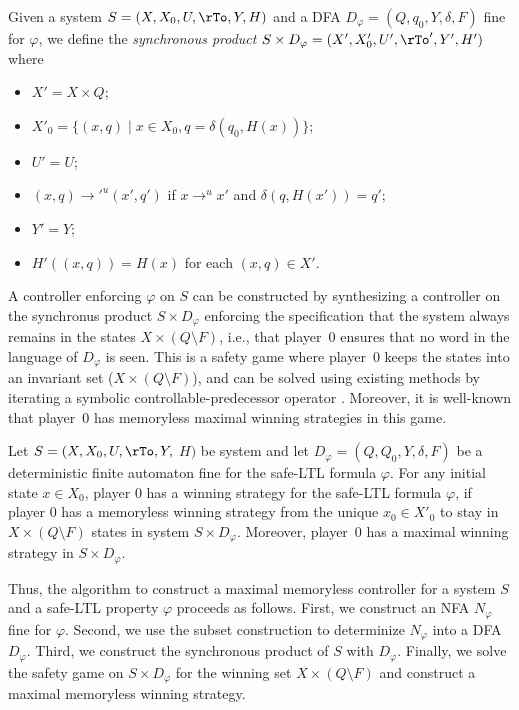 Given a system $S = (X, X_0, U, \rTo, Y, H)$ and a DFA $D_{\varphi} =
(Q, q_0, Y, \delta, F)$ fine for $\varphi$, we
define the \emph{synchronous product} $S\times D_{\varphi} =
(X',X'_0,U',\rTo', Y', H')$ where
\begin{itemize}
 \item $X' = X \times Q$;
 \item $X'_0 = \{(x,q) \mid x \in X_0, q = \delta(q_0,H(x))\} $;
\item  $U' = U$;
\item  $(x,q)\to'^u (x',q')$ if $x \to^u x' $ and $\delta(q,H(x')) = q'$;
\item $Y' = Y$;
\item  $H'((x,q)) = H(x)$ for each $(x,q) \in X'$.
\end{itemize}
A controller enforcing $\varphi$ on $S$ can be constructed by synthesizing a controller
on the synchronus product $S\times D_{\varphi}$ enforcing the
specification that the system always remains in the states 
$X \times (Q\setminus F)$, i.e., that player~0 ensures that no word in the
language of $D_{\varphi}$ is seen.
This is a safety game where player~0 keeps the states into an
invariant set ($X\times (Q\setminus F)$), and can be solved using
existing methods by iterating a symbolic controllable-predecessor operator
\cite{Zielonka98,MazoDT10}.
Moreover, it is well-known that player~0 has memoryless maximal
winning strategies in this game.




\begin{theorem}\label{th:fine}
Let $S =  (X,X_0,U,\rTo,Y,$ $H)$ be system and let $D_{\varphi} = (Q,Q_0,Y, \delta,F)$ 
be a deterministic finite automaton fine for the safe-LTL formula $\varphi$.
For any initial state $x\in X_0$, player 0
has a winning strategy for the safe-LTL formula $\varphi$, if
player 0 has a memoryless winning strategy from the unique $x_0 \in X'_0$ to stay in $X
\times (Q\setminus F)$ states in system $S\times D_{\varphi}$.
Moreover, player~0 has a maximal winning strategy in $S\times D_\varphi$.
\end{theorem}



Thus, the algorithm to construct a maximal memoryless controller for a
system $S$ and a 
safe-LTL property $\varphi$ proceeds as follows.
First, we construct an NFA $N_\varphi$ fine for $\varphi$.
Second, we use the subset construction to determinize $N_\varphi$ into
a DFA $D_\varphi$.
Third, we construct the synchronous product of $S$ with $D_\varphi$.
Finally, we solve the safety game on $S\times D_\varphi$ for the
winning set $X\times (Q\setminus F)$ and construct a maximal
memoryless winning strategy.

